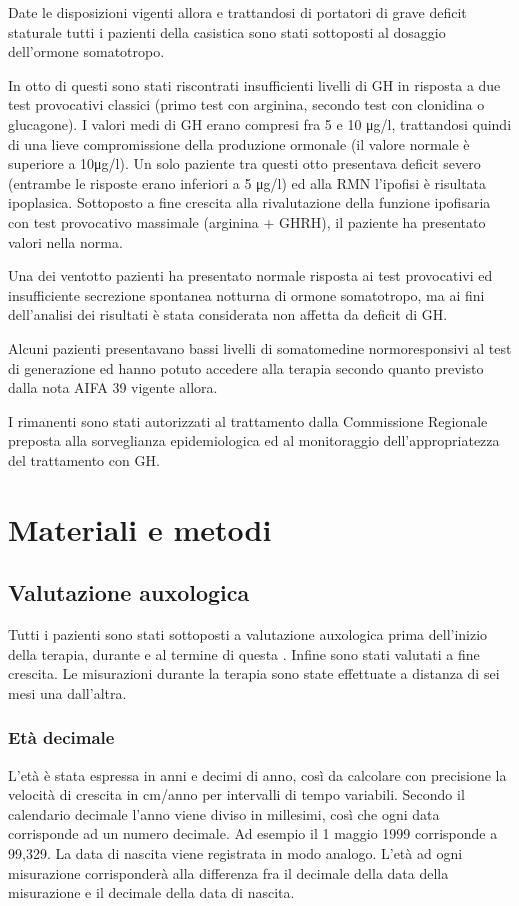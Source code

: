 Date le disposizioni vigenti allora e trattandosi di portatori di grave deficit staturale tutti i pazienti della casistica sono stati sottoposti al dosaggio dell'ormone somatotropo. 

In otto di questi sono stati riscontrati insufficienti livelli di GH in risposta a due test provocativi classici (primo test con arginina, secondo test con clonidina o glucagone). I valori medi di GH erano compresi fra 5 e 10 \unit{\micro g}/l, trattandosi quindi di una lieve compromissione della produzione ormonale (il valore normale è superiore a 10\unit{\micro g}/l). Un solo paziente tra questi otto presentava deficit severo (entrambe le risposte erano inferiori a 5 \unit{\micro g}/l) ed alla RMN l'ipofisi è risultata ipoplasica. Sottoposto a fine crescita alla rivalutazione della funzione ipofisaria con test provocativo massimale (arginina + GHRH), il paziente ha presentato valori nella norma.

 Una dei ventotto pazienti ha presentato normale risposta ai test provocativi ed insufficiente secrezione spontanea notturna di ormone somatotropo, ma ai fini dell'analisi dei risultati è stata considerata non affetta da deficit di GH.
 
 Alcuni pazienti presentavano bassi livelli di somatomedine normoresponsivi al test di generazione ed hanno potuto accedere alla terapia secondo quanto previsto dalla nota AIFA 39 vigente allora.
 
 I rimanenti sono stati autorizzati al trattamento dalla Commissione Regionale preposta alla sorveglianza epidemiologica ed al monitoraggio dell'appropriatezza del trattamento con GH. 

\section{Materiali e metodi}

\subsection{Valutazione auxologica}
Tutti i pazienti sono stati sottoposti a valutazione auxologica prima dell'inizio della terapia, durante e al termine di questa . Infine sono stati valutati a fine crescita. Le misurazioni durante la terapia sono state effettuate a distanza di sei mesi una dall'altra.

\subsubsection*{Età decimale}
L'età è stata espressa in anni e decimi di anno, così da calcolare con precisione la velocità di crescita in cm/anno per intervalli di tempo variabili. Secondo il calendario decimale l'anno viene diviso in millesimi, così che ogni data corrisponde ad un numero decimale. Ad esempio il 1 maggio 1999 corrisponde a 99,329. La data di nascita viene registrata in modo analogo. L'età ad ogni misurazione corrisponderà alla differenza fra il decimale della data della misurazione e il decimale della data di nascita\cite{tanner1990foetus}.    


